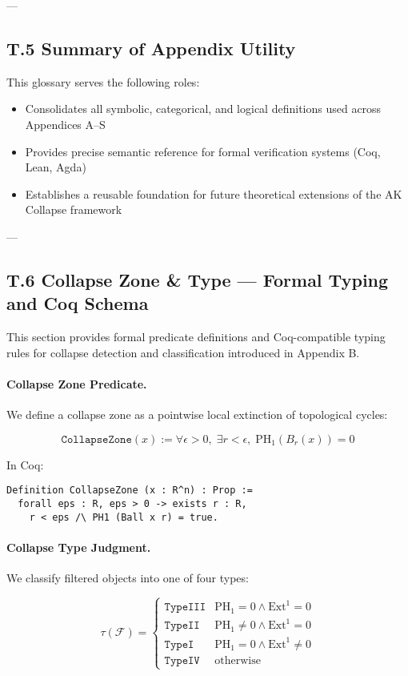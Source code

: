 \documentclass[11pt]{article}
\begin{document}
{---

\subsection*{T.5 Summary of Appendix Utility}

This glossary serves the following roles:

\begin{itemize}
  \item Consolidates all symbolic, categorical, and logical definitions used across Appendices A–S
  \item Provides precise semantic reference for formal verification systems (Coq, Lean, Agda)
  \item Establishes a reusable foundation for future theoretical extensions of the AK Collapse framework
\end{itemize}

---

\subsection*{T.6 Collapse Zone \& Type — Formal Typing and Coq Schema}

This section provides formal predicate definitions and Coq-compatible typing rules  
for collapse detection and classification introduced in Appendix B.

\paragraph{Collapse Zone Predicate.}
We define a collapse zone as a pointwise local extinction of topological cycles:

\[
\texttt{CollapseZone}(x) := \forall \epsilon > 0,\; \exists r < \epsilon,\; \mathrm{PH}_1(B_r(x)) = 0
\]

In Coq:
\begin{lstlisting}[language=Coq]
Definition CollapseZone (x : R^n) : Prop :=
  forall eps : R, eps > 0 -> exists r : R,
    r < eps /\ PH1 (Ball x r) = true.
\end{lstlisting}

\paragraph{Collapse Type Judgment.}
We classify filtered objects into one of four types:

\[
\tau(\mathcal{F}) =
\begin{cases}
\texttt{TypeIII} & \mathrm{PH}_1 = 0 \land \mathrm{Ext}^1 = 0 \\
\texttt{TypeII} & \mathrm{PH}_1 \ne 0 \land \mathrm{Ext}^1 = 0 \\
\texttt{TypeI} & \mathrm{PH}_1 = 0 \land \mathrm{Ext}^1 \ne 0 \\
\texttt{TypeIV} & \text{otherwise}
\end{cases}
\]

}
\end{document}
